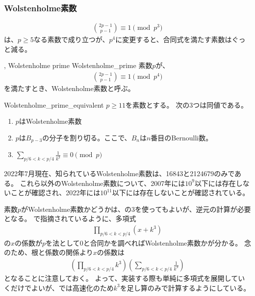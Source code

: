 \subsubsection{Wolstenholme素数}

\begin{align*}
{2p-1 \choose p-1} \equiv 1 \pmod{p^3}
\end{align*}
は、$p\ge5$なる素数で成り立つが、$p^4$に変更すると、合同式を満たす素数はぐっと減る。

\begin{Defi}{, Wolstenholme prime \cite{RichardJ1995}}{Wolstenholme_prime}
素数$p$が、
\begin{align*}
{2p-1 \choose p-1} \equiv 1 \pmod{p^4}
\end{align*}
を満たすとき、Wolstenholme素数と呼ぶ。
\end{Defi}

\begin{Theo}{\cite{RichardJ1995}}{Wolstenholme_prime_equivalent}
$p\ge11$を素数とする。
次の3つは同値である。
\begin{enumerate}
 \item $p$はWolstenholme素数
 \item $p$は$B_{p-3}$の分子を割り切る。ここで、$B_n$は$n$番目のBernoulli数。
 \item $\sum_{p/6<k<p/4}\frac{1}{k^3} \equiv 0 \pmod{p}$
\end{enumerate}
\end{Theo}

2022年7月現在、知られているWolstenholme素数は、16843と2124679のみである。
これら以外のWolstenholme素数について、2007年には$10^9$以下には存在しないことが確認され\cite{McIntosh2007ASF}、2022年には$10^{11}$以下には存在しないことが確認されている\cite{Booker2022}。

素数$p$がWolstenholme素数かどうかは、の3を使ってもよいが、逆元の計算が必要となる。
\cite{McIntosh2007ASF}で指摘されているように、多項式
\begin{align*}
\prod_{p/6<k<p/4} (x+k^3)
\end{align*}
の$x$の係数が$p$を法として0と合同かを調べればWolstenholme素数かが分かる。
念のため、根と係数の関係より$x$の係数は
\begin{align*}
\left(\prod_{p/6<k<p/4}k^3\right)\left(\sum_{p/6<k<p/4}\frac{1}{k^3}\right)
\end{align*}
となることに注意しておく。
よって、実装する際も単純に多項式を展開していくだけでよいが、では高速化のため$k^3$を足し算のみで計算するようにしている。

